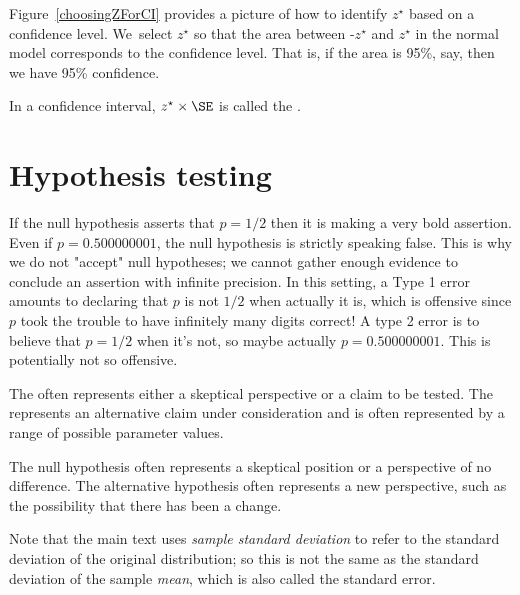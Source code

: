 Figure~\ref{choosingZForCI} provides a picture of how to identify $z^{\star}$ based on a confidence level. We~select $z^{\star}$ so that the area between -$z^{\star}$ and $z^{\star}$ in the normal model corresponds to the confidence level. That is, if the area is 95\%, say, then we have 95\% confidence.

\begin{termBox}{
\label{marginOfErrorTermBox}In a confidence interval, $z^{\star}\times \SE$ is called the .}
\end{termBox}


\section{Hypothesis testing}
\label{hypothesisTesting}



If the null hypothesis asserts that $p=1/2$ then it is making a very bold assertion. Even if $p=0.500000001$, the null hypothesis is strictly speaking false. This is why we do not "accept" null hypotheses; we cannot gather enough evidence to conclude an assertion with infinite precision. In this setting, a Type 1 error amounts to declaring that $p$ is not $1/2$ when actually it is, which is offensive since $p$ took the trouble to have infinitely many digits correct! A type 2 error is to believe that $p=1/2$ when it's not, so maybe actually $p=0.500000001$. This is potentially not so offensive.



\begin{termBox}{
{\small The  often represents either a skeptical perspective or a claim to be tested. The  represents an alternative claim under consideration and is often represented by a range of possible parameter values.}}
\end{termBox}

The null hypothesis often represents a skeptical position or a perspective of no difference. The alternative hypothesis often represents a new perspective, such as the possibility that there has been a change. 


Note that the main text uses \emph{sample standard deviation} to refer to the standard deviation of the original distribution; so this is not the same as the standard deviation of the sample \emph{mean}, which is also called the standard error.


